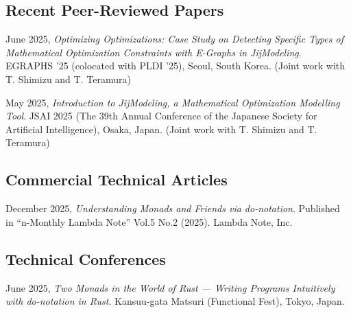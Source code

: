 \documentclass{moderncv}
\begin{document}
\subsection{Recent Peer-Reviewed Papers}

\noindent
June 2025, \emph{Optimizing Optimizations: Case Study on Detecting Specific Types of Mathematical Optimization Constraints with E-Graphs in JijModeling}. EGRAPHS '25 (colocated with PLDI '25), Seoul, South Korea. (Joint work with T. Shimizu and T. Teramura)

\noindent
May 2025, \emph{Introduction to JijModeling, a Mathematical Optimization Modelling Tool}. JSAI 2025 (The 39th Annual Conference of the Japanese Society for Artificial Intelligence), Osaka, Japan. (Joint work with T. Shimizu and T. Teramura)

\subsection{Commercial Technical Articles}

\noindent
December 2025, \emph{Understanding Monads and Friends via do-notation}. Published in ``n-Monthly Lambda Note'' Vol.5 No.2 (2025). Lambda Note, Inc.

\subsection{Technical Conferences}

\noindent
June 2025, \emph{Two Monads in the World of Rust --- Writing Programs Intuitively with do-notation in Rust}. Kansuu-gata Matsuri (Functional Fest), Tokyo, Japan.

\nocite{*}
\printbibliography[title={Publications},prenote=note]
\end{document}
